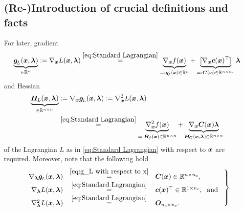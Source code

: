 \documentclass[journal]{IEEEtranTIE}
\newcommand{\CHHA}[1]{{\color{red} [CH: #1]}} %
\newcommand{\KYCH}[1]{{\color{blue} [KC: #1]}} %
\begin{document}
\subsection{(Re-)Introduction of crucial definitions and facts}
For later, gradient 
%
\begin{align}
    \underbrace{\mv{g}_{\! L}(\mv{x},\mv{\lambda})}_{\in \R^n} 
    := 
    \nabla_{\mv{x}} L(\mv{x},\mv{\lambda}) 
    \stackrel{\eqref{eq:Standard Lagrangian}}{=} 
    \underbrace{\nabla_{\mv{x}} f(\mv{x})}_{=:\mv{g}_{\! f}(\mv{x}) \in \R^n} 
    +
    \underbrace{[\nabla_{\mv{x}} \mv{c}(\mv{x})^\top]}_{=:\mm{C}(\mv{x}) \in \R^{n \times n_{\rm c} }} \mv{\lambda} 
\label{eq:g_L with respect to x}
\end{align}
%
and Hessian 
%
\begin{align}
\underbrace{\mm{H}_{\! L}(\mv{x},\mv{\lambda})}_{\in \R^{n \times n}} 
    & :=  \nabla_{\mv{x}} \mv{g}_{\! L}(\mv{x},\mv{\lambda}) := \nabla_{\mv{x}}^2 L(\mv{x},\mv{\lambda})  \notag \\
    & \stackrel{\eqref{eq:Standard Lagrangian}}{=} \underbrace{\nabla_{\mv{x}}^2 f(\mv{x})}_{=:\mm{H}_{\! f}(\mv{x}) \in \R^{n \times n}} + \underbrace{\nabla_{\mv{x}}  \mm{C}(\mv{x})\mv{\lambda}}_{\mm{H}_{\!C}(\mv{x},\mv{\lambda}) \in \R^{n \times n} }
\label{eq:H_L with respect to x}
\end{align}
%
of the Lagrangian $L$ as in \eqref{eq:Standard Lagrangian} with respect to $\boldsymbol{x}$ are required.
Moreover, note that the following hold
%
\begin{equation}
\left.\begin{array}{rcl}
 \nabla_{\mv{\lambda}} \mv{g}_{\! L}(\mv{x},\mv{\lambda}) & \stackrel{\eqref{eq:g_L with respect to x}}{=} & \mm{C}(\mv{x})  \in \R^{n \times n_{\rm c}}, \\ 
 \nabla_{\mv{\lambda}} L(\mv{x},\mv{\lambda}) & \stackrel{\eqref{eq:Standard Lagrangian}}{=} & \mv{c}(\mv{x})^\top \in \R^{1 \times n_{\rm c}}, \; \text{ and }\\ 
 \nabla_{\mv{\lambda}}^2 L(\mv{x},\mv{\lambda}) & \stackrel{\eqref{eq:Standard Lagrangian}}{=} & \mm{O}_{n_{\rm c} \times n_{\rm c}}.
 \end{array}\right\}
\label{eq:nabla_lambda g_L, nabla_lambda L and nabla_lambda^2 L}
\end{equation}
\end{document}
